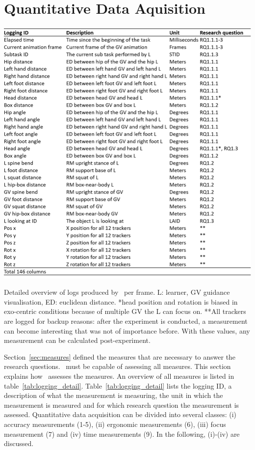 \section{Quantitative Data Aquisition}
\label{sec:logging}
\begin{table}[H]
	\centering
	\includegraphics[width=\textwidth]{figures/logging_detail.png}
	\caption[Logfile description]{Detailed overview of logs produced by \exgo\ per frame. L: learner, GV guidance visualisation, ED: euclidean distance. *head position and rotation is biased in exo-centric conditions because of multiple GV the L can focus on. **All trackers are logged for backup reasons: after the experiment is conducted, a measurement can become interesting that was not of importance before. With these values, any measurement can be calculated post-experiment.}
	\label{tab:logging_detail}
\end{table}
Section~\ref{sec:measures} defined the measures that are necessary to answer the research questions. \exgo\ must be capable of assessing all measures. This section explains how \exgo\ assesses the measures. An overview of all measures is listed in table~\ref{tab:logging_detail}. Table~\ref{tab:logging_detail} lists the logging ID, a description of what the measurement is measuring, the unit in which the measurement is measured and for which research question the measurement is assessed. Quantitative data acquisition can be divided into several classes: (i) accuracy measurements (1-5), (ii) ergonomic measurements (6), (iii) focus measurement (7) and (iv) time measurements (9). In the following, (i)-(iv) are discussed.


